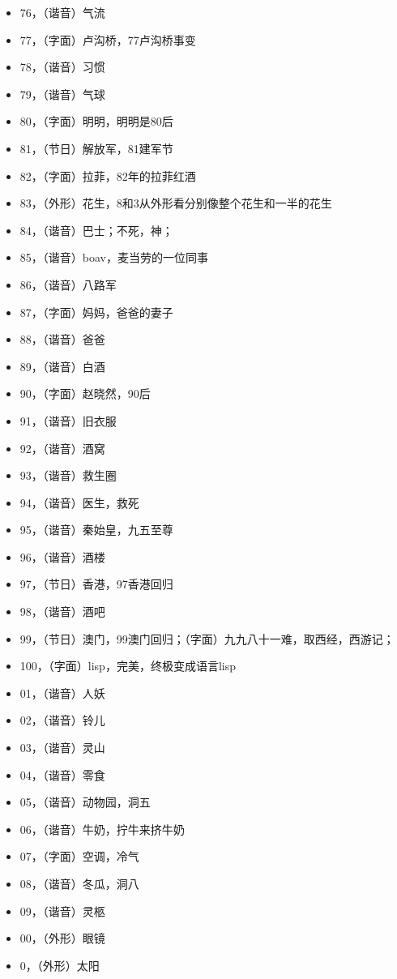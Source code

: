 \begin{itemize}
\item 76，（谐音）气流
\item 77，（字面）卢沟桥，77卢沟桥事变
\item 78，（谐音）习惯
\item 79，（谐音）气球
\item 80，（字面）明明，明明是80后
\item 81，（节日）解放军，81建军节
\item 82，（字面）拉菲，82年的拉菲红酒 
\item 83，（外形）花生，8和3从外形看分别像整个花生和一半的花生
\item 84，（谐音）巴士；不死，神；
\item 85，（谐音）boav，麦当劳的一位同事
\item 86，（谐音）八路军
\item 87，（字面）妈妈，爸爸的妻子
\item 88，（谐音）爸爸
\item 89，（谐音）白酒
\item 90，（字面）赵晓然，90后
\item 91，（谐音）旧衣服
\item 92，（谐音）酒窝
\item 93，（谐音）救生圈
\item 94，（谐音）医生，救死
\item 95，（谐音）秦始皇，九五至尊
\item 96，（谐音）酒楼
\item 97，（节日）香港，97香港回归
\item 98，（谐音）酒吧
\item 99，（节日）澳门，99澳门回归；（字面）九九八十一难，取西经，西游记；
\item 100，（字面）lisp，完美，终极变成语言lisp
\item 01，（谐音）人妖
\item 02，（谐音）铃儿
\item 03，（谐音）灵山
\item 04，（谐音）零食
\item 05，（谐音）动物园，洞五
\item 06，（谐音）牛奶，拧牛来挤牛奶
\item 07，（字面）空调，冷气
\item 08，（谐音）冬瓜，洞八
\item 09，（谐音）灵柩
\item 00，（外形）眼镜
\item 0，（外形）太阳
\end{itemize}

